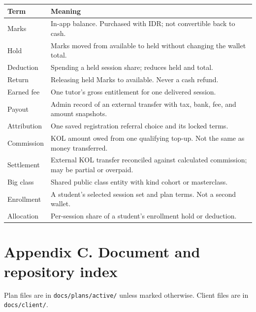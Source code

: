 \documentclass[11pt,a4paper]{article}
\newcommand{\code}[1]{\texttt{#1}}
\begin{document}
\begin{tabular}{@{}L{3.6cm}L{12.0cm}@{}}
\toprule
\textbf{Term} & \textbf{Meaning} \\
\midrule
Marks & In-app balance. Purchased with IDR; not convertible back to cash. \\
Hold & Marks moved from available to held without changing the wallet total. \\
Deduction & Spending a held session share; reduces held and total. \\
Return & Releasing held Marks to available. Never a cash refund. \\
Earned fee & One tutor's gross entitlement for one delivered session. \\
Payout & Admin record of an external transfer with tax, bank, fee, and amount snapshots. \\
Attribution & One saved registration referral choice and its locked terms. \\
Commission & KOL amount owed from one qualifying top-up. Not the same as money transferred. \\
Settlement & External KOL transfer reconciled against calculated commission; may be partial or overpaid. \\
Big class & Shared public class entity with kind cohort or masterclass. \\
Enrollment & A student's selected session set and plan terms. Not a second wallet. \\
Allocation & Per-session share of a student's enrollment hold or deduction. \\
\bottomrule
\end{tabular}

\newpage
\section{Appendix C. Document and repository index}

Plan files are in \code{docs/plans/active/} unless marked otherwise. Client files are in \code{docs/client/}.
\end{document}
